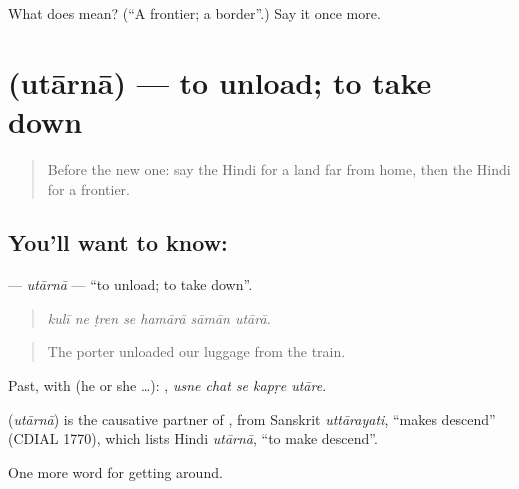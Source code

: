 \begin{tcolorbox}[breakable,colback=teal!4,colframe=teal!35!black,title={Before you move on}]
What does  mean? (\textquotedblleft{}A frontier; a border\textquotedblright{}.) Say it once more.
\end{tcolorbox}
\section[\texorpdfstring{\hi{उतारना} (utārnā)}{उतारना (utārnā)}]{ (utārnā) — to unload; to take down}

\label{lesson:HI-C412-utaarna}



\begin{quote}
Before the new one: say the Hindi for a land far from home, then the Hindi for a frontier.
\end{quote}

\subsection*{You'll want to know: }
\textbf{} — \emph{utārnā} — \textquotedblleft{}to unload; to take down\textquotedblright{}.

\begin{quote}
      
\end{quote}

\begin{quote}
\emph{kulī ne ṭren se hamārā sāmān utārā.}
\end{quote}

\begin{quote}
The porter unloaded our luggage from the train.
\end{quote}

Past, with  (he or she …):     , \emph{usne chat se kapṛe utāre}.

\begin{cousinweb}
\textbf{} (\emph{utārnā}) is the causative partner of , from Sanskrit \emph{uttārayati}, \textquotedblleft{}makes descend\textquotedblright{} (CDIAL 1770), which lists Hindi \emph{utārnā}, \textquotedblleft{}to make descend\textquotedblright{}.
\end{cousinweb}

\begin{grammarlens}[title={What you've built}]
One more word for getting around.
\end{grammarlens}

